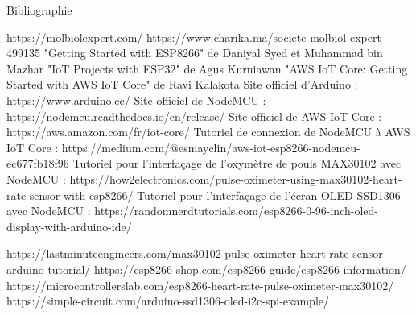 

Bibliographie 

\begin{flushleft}
https://molbiolexpert.com/ \newline
https://www.charika.ma/societe-molbiol-expert-499135  \newline
"Getting Started with ESP8266" de Daniyal Syed et Muhammad bin Mazhar \newline
"IoT Projects with ESP32" de Agus Kurniawan  \newline
"AWS IoT Core: Getting Started with AWS IoT Core" de Ravi Kalakota \newline
Site officiel d'Arduino : https://www.arduino.cc/ \newline
Site officiel de NodeMCU : https://nodemcu.readthedocs.io/en/release/ \newline
Site officiel de AWS IoT Core : https://aws.amazon.com/fr/iot-core/ \newline
Tutoriel de connexion de NodeMCU à AWS IoT Core : https://medium.com/@esmayclin/aws-iot-esp8266-nodemcu-ec677fb18f96 \newline
Tutoriel pour l'interfaçage de l'oxymètre de pouls MAX30102 avec NodeMCU : https://how2electronics.com/pulse-oximeter-using-max30102-heart-rate-sensor-with-esp8266/  \newline
Tutoriel pour l'interfaçage de l'écran OLED SSD1306 avec NodeMCU : https://randomnerdtutorials.com/esp8266-0-96-inch-oled-display-with-arduino-ide/ \newline

https://lastminuteengineers.com/max30102-pulse-oximeter-heart-rate-sensor-arduino-tutorial/  \newline
https://esp8266-shop.com/esp8266-guide/esp8266-information/ \newline
https://microcontrollerslab.com/esp8266-heart-rate-pulse-oximeter-max30102/ \newline
https://simple-circuit.com/arduino-ssd1306-oled-i2c-spi-example/ \newline
\end{flushleft}